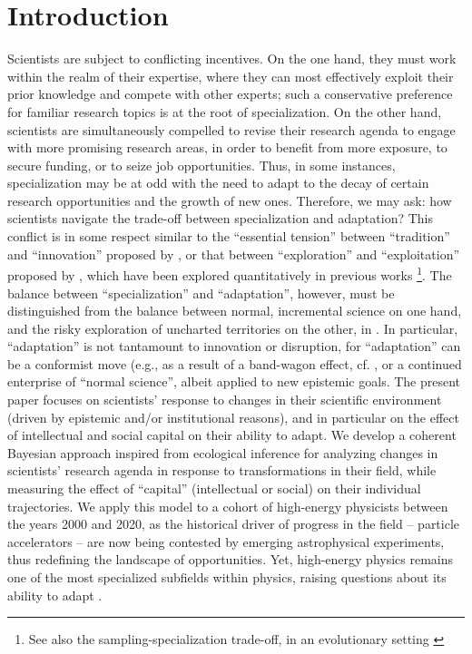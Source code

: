\documentclass{article}
\begin{document}
\section{Introduction}

Scientists are subject to conflicting incentives. On the one hand, they must work within the realm of their expertise, where they can most effectively exploit their prior knowledge and compete with other experts; such a conservative preference for familiar research topics is at the root of specialization. On the other hand, scientists are simultaneously compelled to revise their research agenda to engage with more promising research areas, in order to benefit from more exposure, to secure funding, or to seize job opportunities. Thus, in some instances, specialization may be at odd with the need to adapt to the decay of certain research opportunities and the growth of new ones. Therefore, we may ask: how scientists navigate the trade-off between specialization and adaptation? This conflict is in some respect similar to the ``essential tension'' between ``tradition'' and ``innovation'' proposed by \citet{Kuhn1997}, or that between ``exploration'' and ``exploitation'' proposed by \citet{March1991}, which have been explored quantitatively in previous works \citep{Foster2015,Jia2017,Aleta2019,Zeng2019,Tripodi2020,Chakresh2023,Feifan2023}\footnote{See also the sampling-specialization trade-off, in an evolutionary setting \citep{Frankenhuis2011}}. The balance between ``specialization'' and ``adaptation'', however, must be distinguished from the balance between normal, incremental science on one hand, and the risky exploration of uncharted territories on the other, in \citet{Foster2015}. In particular, ``adaptation'' is not tantamount to innovation or disruption, for ``adaptation'' can be a conformist move (e.g., as a result of a band-wagon effect, cf. \citealt{Fujimura1988}, or a continued enterprise of ``normal science'', albeit applied to new epistemic goals. The present paper focuses on scientists' response to changes in their scientific environment (driven by epistemic and/or institutional reasons), and in particular on the effect of intellectual and social capital on their ability to adapt. We develop a coherent Bayesian approach inspired from ecological inference for analyzing changes in scientists' research agenda in response to transformations in their field, while measuring the effect of ``capital'' (intellectual or social) on their individual trajectories. We apply this model to a cohort of high-energy physicists between the years 2000 and 2020, as the historical driver of progress in the field -- particle accelerators -- are now being contested by emerging astrophysical experiments, thus redefining the landscape of opportunities. Yet, high-energy physics remains one of the most specialized subfields within physics, raising questions about its ability to adapt \citep{Battiston2019,Aleta2019}.
\end{document}

